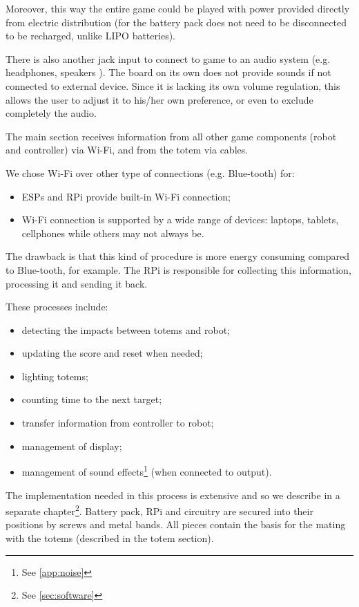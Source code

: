 \documentclass[a4paper,twoside]{book}
\begin{document}
Moreover, this way the entire game could be played with power provided directly from electric distribution (for the battery pack does not need to be disconnected to be recharged, unlike LIPO batteries).

There is also another jack input to connect to game to an audio system (e.g. headphones, speakers \textellipsis). The board on its own does not provide sounds if not connected to external device. Since it is lacking its own volume regulation, this allows the user to adjust it to his/her own preference, or even to exclude completely the audio.

The main section receives information from all other game components (robot and controller) via Wi-Fi, and from the totem via cables.

\beforelist We chose Wi-Fi over other type of connections (e.g. Blue-tooth) for:
\begin{itemize}
\item ESPs and RPi provide built-in Wi-Fi connection;
\item Wi-Fi connection is supported by a wide range of devices: laptops, tablets, cellphones \textellipsis while others may not always be. 
\end{itemize}
\afterlist*
The drawback is that this kind of procedure is more energy consuming compared to Blue-tooth, for example.
The RPi is responsible for collecting this information, processing it and sending it back.

\beforelist These processes include:
\begin{itemize}
\item detecting the impacts between totems and robot;
\item updating the score and reset when needed;
\item lighting totems;
\item counting time to the next target;
\item transfer information from controller to robot;
\item management of display;
\item management of sound effects\footnote {See \autoref{app:noise}} (when connected to output).
\end{itemize}
\afterlist*
The implementation needed in this process is extensive and so we describe in a separate chapter\footnote{ See \autoref{sec:software}}.
Battery pack, RPi and circuitry are secured into their positions by screws and metal bands. All pieces contain the basis for the mating with the totems (described in the totem section).
\end{document}
